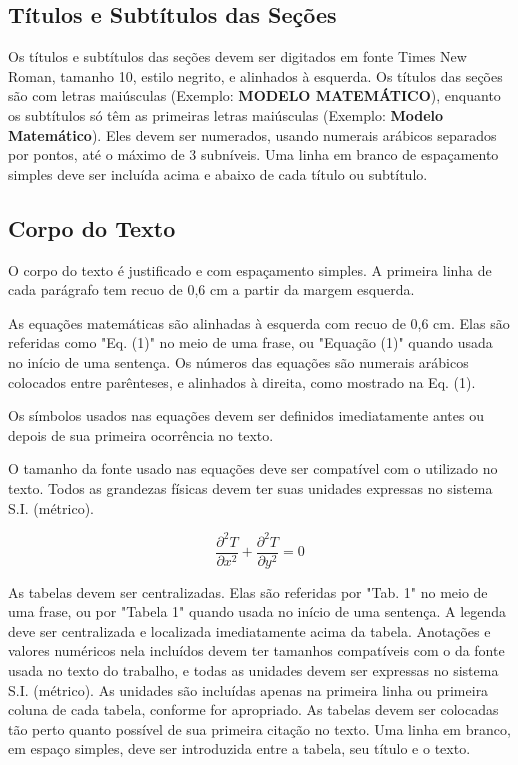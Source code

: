 \documentclass[10pt,fleqn,a4paper]{article}
\begin{document}
    \subsection{Títulos e Subtítulos das Seções }

        Os títulos e subtítulos das seções devem ser digitados em fonte Times New Roman, tamanho 10, estilo negrito, e alinhados à esquerda. Os títulos das seções são com letras maiúsculas (Exemplo: \textbf{MODELO MATEMÁTICO}), enquanto os subtítulos só têm as primeiras letras maiúsculas (Exemplo: \textbf{Modelo Matemático}). Eles devem ser numerados, usando numerais arábicos separados por pontos, até o máximo de 3 subníveis. Uma linha em branco de espaçamento simples deve ser incluída acima e abaixo de cada título ou subtítulo.

    \subsection{Corpo do Texto}

        O corpo do texto é justificado e com espaçamento simples. A primeira linha de cada parágrafo tem recuo de 0,6 cm a partir da margem esquerda.

        As equações matemáticas são alinhadas à esquerda com recuo de 0,6 cm.  Elas são referidas como "Eq. (1)" no meio de uma frase, ou "Equação (1)" quando usada no início de uma sentença. Os números das equações são numerais arábicos colocados entre parênteses, e alinhados à direita, como mostrado na Eq. (1).

        Os símbolos usados nas equações devem ser definidos imediatamente antes ou depois de sua primeira ocorrência no texto. \citep{artigoMangaSBAI}

        O tamanho da fonte usado nas equações deve ser compatível com o utilizado no texto. Todos as grandezas físicas devem ter suas unidades expressas no sistema S.I. (métrico).

        \begin{equation}
        \frac{\partial^2 T}{\partial x^2} + \frac{\partial^2 T}{\partial y^2} = 0 \label{equation1}
        \end{equation}

        As tabelas devem ser centralizadas. Elas são referidas por "Tab. 1" no meio de uma frase, ou por "Tabela 1" quando usada no início de uma sentença. A legenda deve ser centralizada e localizada imediatamente acima da tabela. Anotações e valores numéricos nela incluídos devem ter tamanhos compatíveis com o da fonte usada no texto do trabalho, e todas as unidades devem ser expressas no sistema S.I. (métrico). As unidades são incluídas apenas na primeira linha ou primeira coluna de cada tabela, conforme for apropriado. As tabelas devem ser colocadas tão perto quanto possível de sua primeira citação no texto. Uma linha em branco, em espaço simples, deve ser introduzida entre a tabela, seu título e o texto.
\end{document}
